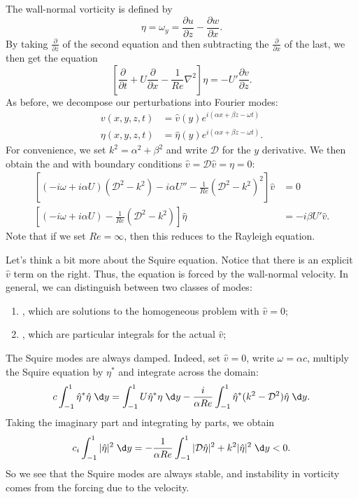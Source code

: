 \documentclass[a4paper]{article}
\begin{document}
The wall-normal vorticity is defined by
\[
  \eta = \omega_y = \frac{\partial u}{\partial z} - \frac{\partial w}{\partial x}.
\]
By taking $\frac{\partial}{\partial z}$ of the second equation and then subtracting the $\frac{\partial}{\partial x}$ of the last, we then get the equation
\[
  \left[\frac{\partial}{\partial t} + U \frac{\partial}{\partial x} - \frac{1}{Re} \nabla^2\right] \eta = - U' \frac{\partial v}{\partial z}.
\]
As before, we decompose our perturbations into Fourier modes:
\begin{align*}
  v(x, y, z, t) &= \hat{v}(y) e^{i(\alpha x + \beta z - \omega t)}\\
  \eta(x, y, z, t) &= \hat{\eta}(y) e^{i(\alpha x + \beta z - \omega t)}.
\end{align*}
For convenience, we set $k^2 = \alpha^2 + \beta^2$ and write $\mathcal{D}$ for the $y$ derivative. We then obtain the  and  with boundary conditions $\hat{v} = \mathcal{D} \hat{v} = \eta = 0$:
\begin{align*}
  \left[(-i\omega + i \alpha U)(\mathcal{D}^2 - k^2) - i \alpha U'' - \frac{1}{Re} (\mathcal{D}^2 - k^2)^2\right] \hat{v} &= 0\\
  \left[(-i\omega + i \alpha U) - \frac{1}{Re} (\mathcal{D}^2 - k^2) \right] \hat{\eta} &= -i\beta U' \hat{v}.
\end{align*}
Note that if we set $Re = \infty$, then this reduces to the Rayleigh equation.

Let's think a bit more about the Squire equation. Notice that there is an explicit $\hat{v}$ term on the right. Thus, the equation is forced by the wall-normal velocity. In general, we can distinguish between two classes of modes:
\begin{enumerate}
  \item {}, which are solutions to the homogeneous problem with $\hat{v} = 0$;
  \item {}, which are particular integrals for the actual $\hat{v}$;
\end{enumerate}
The Squire modes are always damped. Indeed, set $\hat{v} = 0$, write $\omega = \alpha c$, multiply the Squire equation by $\eta^*$ and integrate across the domain:
\[
  c \int_{-1}^1 \hat{\eta}^* \hat{\eta} \;\d y = \int_{-1}^1 U \hat{\eta}^* \eta \;\d y - \frac{i}{\alpha Re} \int_{-1}^1 \hat{\eta}^* (k^2 - \mathcal{D}^2) \hat{\eta}\;\d y.
\]
Taking the imaginary part and integrating by parts, we obtain
\[
  c_i \int_{-1}^1 |\hat{\eta}|^2 \;\d y = - \frac{1}{\alpha Re} \int_{-1}^1 |\mathcal{D} \hat{\eta}|^2 + k^2 |\hat{\eta}|^2 \;\d y < 0.
\]
So we see that the Squire modes are always stable, and instability in vorticity comes from the forcing due to the velocity.
\end{document}
